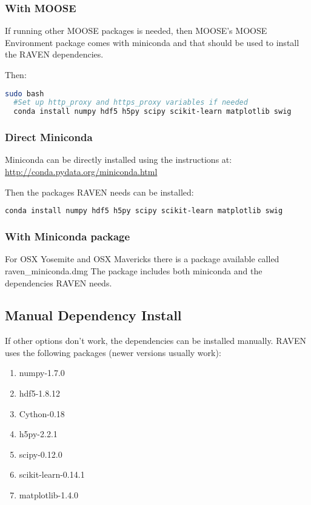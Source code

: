 \subsubsection{With MOOSE}

If running other MOOSE packages is needed, then MOOSE's MOOSE
Environment package comes with miniconda and that should be used to
install the RAVEN dependencies.

Then:
\begin{lstlisting}[language=bash]
  sudo bash
  #Set up http_proxy and https_proxy variables if needed
  conda install numpy hdf5 h5py scipy scikit-learn matplotlib swig
\end{lstlisting}

\subsubsection{Direct Miniconda}

Miniconda can be directly installed using the instructions at: \url{http://conda.pydata.org/miniconda.html}

Then the packages RAVEN needs can be installed:
\begin{lstlisting}[language=bash]
  conda install numpy hdf5 h5py scipy scikit-learn matplotlib swig
\end{lstlisting}

\subsubsection{With Miniconda package}

For OSX Yosemite and OSX Mavericks there is a package available called
raven\_miniconda.dmg The package includes both miniconda and the
dependencies RAVEN needs.

\subsection{Manual Dependency Install}

If other options don't work, the dependencies can be installed
manually.  RAVEN uses the following packages (newer versions usually
work):

\begin{enumerate}
\item numpy-1.7.0
\item hdf5-1.8.12
\item Cython-0.18
\item h5py-2.2.1
\item scipy-0.12.0
\item scikit-learn-0.14.1
\item matplotlib-1.4.0
\end{enumerate}


